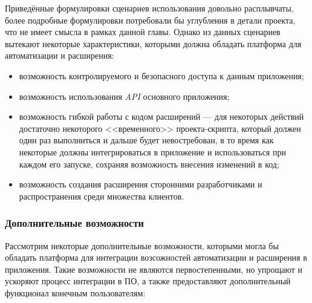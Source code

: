 Приведённые формулировки сценариев использования довольно расплывчаты, более подробные формулировки потребовали бы углубления в детали проекта, что не имеет смысла в рамках данной главы. Однако из данных сценариев вытекают некоторые характеристики, которыми должна обладать платформа для автоматизации и расширения:
\begin{itemize}
 \item возможность контролируемого и безопасного доступа к данным приложения;
 \item возможность использования {\it API} основного приложения;
 \item возможность гибкой работы с кодом расширений --- для некоторых действий достаточно некоторого <<временного>> проекта-скрипта, который должен один раз выполниться и дальше будет невостребован, в то время как некоторые должны интегрироваться в приложение и использоваться при каждом его запуске, сохраняя возможность внесения изменений в код;
 \item возможность создания расширения сторонними разработчиками и распространения среди множества клиентов.
\end{itemize}

\subsubsection{Дополнительные возможности}
Рассмотрим некоторые дополнительные возможности, которыми могла бы обладать платформа для интеграции возсожностей автоматизации и расширения в приложения. Такие возможности не являются первостепенными, но упрощают и ускоряют процесс интеграции в ПО, а также предоставляют дополнительный функционал конечным пользователям:

